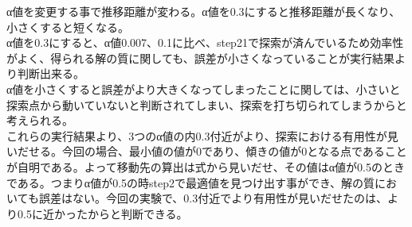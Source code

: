 α値を変更する事で推移距離が変わる。α値を0.3にすると推移距離が長くなり、小さくすると短くなる。\\
α値を0.3にすると、α値0.007、0.1に比べ、step21で探索が済んでいるため効率性がよく、得られる解の質に関しても、誤差が小さくなっていることが実行結果より判断出来る。\\
α値を小さくすると誤差がより大きくなってしまったことに関しては、小さいと探索点から動いていないと判断されてしまい、探索を打ち切られてしまうからと考えられる。\\
これらの実行結果より、3つのα値の内0.3付近がより、探索における有用性が見いだせる。今回の場合、最小値の値が0であり、傾きの値が0となる点であることが自明である。よって移動先の算出は式から見いだせ、その値はα値が0.5のときである。つまりα値が0.5の時step2で最適値を見つけ出す事ができ、解の質においても誤差はない。今回の実験で、0.3付近でより有用性が見いだせたのは、より0.5に近かったからと判断できる。


